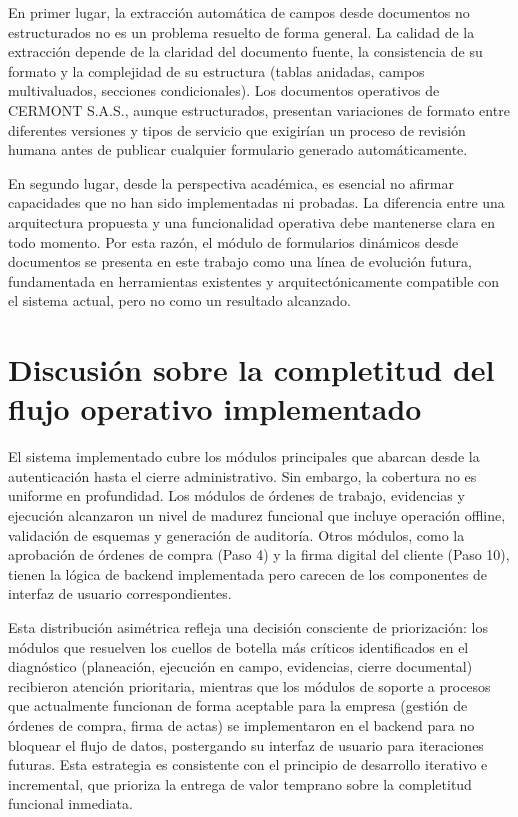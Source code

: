 En primer lugar, la extracción automática de campos desde documentos no estructurados no es un problema resuelto de forma general. La calidad de la extracción depende de la claridad del documento fuente, la consistencia de su formato y la complejidad de su estructura (tablas anidadas, campos multivaluados, secciones condicionales). Los documentos operativos de CERMONT S.A.S., aunque estructurados, presentan variaciones de formato entre diferentes versiones y tipos de servicio que exigirían un proceso de revisión humana antes de publicar cualquier formulario generado automáticamente.

En segundo lugar, desde la perspectiva académica, es esencial no afirmar capacidades que no han sido implementadas ni probadas. La diferencia entre una arquitectura propuesta y una funcionalidad operativa debe mantenerse clara en todo momento. Por esta razón, el módulo de formularios dinámicos desde documentos se presenta en este trabajo como una línea de evolución futura, fundamentada en herramientas existentes y arquitectónicamente compatible con el sistema actual, pero no como un resultado alcanzado.

\section{Discusión sobre la completitud del flujo operativo implementado}
\label{sec:discusion-completitud}

El sistema implementado cubre los módulos principales que abarcan desde la autenticación hasta el cierre administrativo. Sin embargo, la cobertura no es uniforme en profundidad. Los módulos de órdenes de trabajo, evidencias y ejecución alcanzaron un nivel de madurez funcional que incluye operación offline, validación de esquemas y generación de auditoría. Otros módulos, como la aprobación de órdenes de compra (Paso 4) y la firma digital del cliente (Paso 10), tienen la lógica de backend implementada pero carecen de los componentes de interfaz de usuario correspondientes.

Esta distribución asimétrica refleja una decisión consciente de priorización: los módulos que resuelven los cuellos de botella más críticos identificados en el diagnóstico (planeación, ejecución en campo, evidencias, cierre documental) recibieron atención prioritaria, mientras que los módulos de soporte a procesos que actualmente funcionan de forma aceptable para la empresa (gestión de órdenes de compra, firma de actas) se implementaron en el backend para no bloquear el flujo de datos, postergando su interfaz de usuario para iteraciones futuras. Esta estrategia es consistente con el principio de desarrollo iterativo e incremental, que prioriza la entrega de valor temprano sobre la completitud funcional inmediata.

